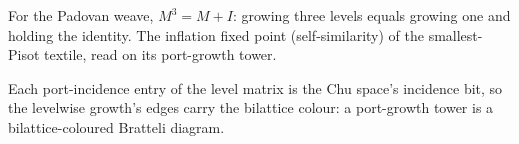 \begin{theorem}\label{thm:port-growth-renorm}\leanok{}
For the Padovan weave, $M^3 = M + I$: growing three levels equals growing one and holding the
identity. The inflation fixed point (self-similarity) of the smallest-Pisot textile, read on its
port-growth tower.
\end{theorem}

\begin{theorem}\label{thm:port-growth-chu}\leanok{}
Each port-incidence entry of the level matrix is the Chu space's incidence bit, so the levelwise
growth's edges carry the bilattice colour: a port-growth tower is a bilattice-coloured Bratteli
diagram.
\end{theorem}

